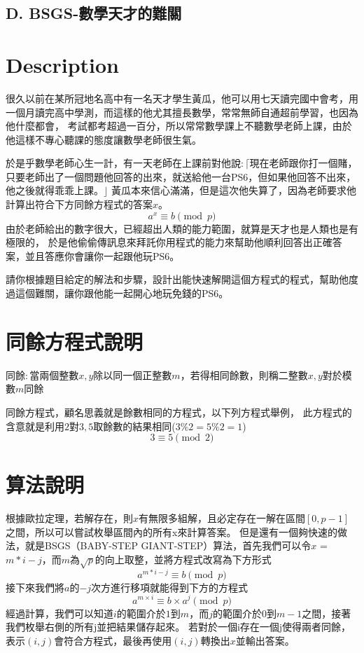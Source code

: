 \documentclass[11pt,a4paper]{article}
\begin{document}
\begin{center}
\section*{D. BSGS-數學天才的難關}
\end{center}

\section*{Description}

很久以前在某所冠地名高中有一名天才學生黃瓜，他可以用七天讀完國中會考，用一個月讀完高中學測，而這樣的他尤其擅長數學，常常無師自通超前學習，也因為他什麼都會，
考試都考超過一百分，所以常常數學課上不聽數學老師上課，由於他這樣不專心聽課的態度讓數學老師很生氣。 

於是乎數學老師心生一計，有一天老師在上課前對他說$ : \lceil $現在老師跟你打一個賭，只要老師出了一個問題他回答的出來，就送給他一台PS6，但如果他回答不出來，他之後就得乖乖上課。$ \rfloor $ 黃瓜本來信心滿滿，但是這次他失算了，因為老師要求他計算出符合下方同餘方程式的答案$x$。
$$
	a^x \equiv b \pmod{p}
$$	
由於老師給出的數字很大，已經超出人類的能力範圍，就算是天才也是人類也是有極限的，
於是他偷偷傳訊息來拜託你用程式的能力來幫助他順利回答出正確答案，並且答應你會讓你一起跟他玩PS6。

請你根據題目給定的解法和步驟，設計出能快速解開這個方程式的程式，幫助他度過這個難關，讓你跟他能一起開心地玩免錢的PS6。

\section*{同餘方程式說明}

同餘$:$當兩個整數$x, y$除以同一個正整數$m$，若得相同餘數，則稱二整數$x, y$對於模數$m$同餘

同餘方程式，顧名思義就是餘數相同的方程式，以下列方程式舉例，
此方程式的含意就是利用$2$對$3, 5$取餘數的結果相同($3\%2 = 5 \% 2 = 1$)\\
$$
	  3 \equiv 5 \pmod{2}
$$

\newpage

\section*{算法說明}
根據歐拉定理，若解存在，則$x$有無限多組解，且必定存在一解在區間$[0, p-1]$之間，所以可以嘗試枚舉區間內的所有x來計算答案。
但是還有一個夠快速的做法，就是BSGS（BABY-STEP GIANT-STEP）算法，首先我們可以令$x$ = $m*i-j$，而$m$為$\sqrt{p}$的向上取整，並將方程式改寫為下方形式  
$$
	a^{m * i - j} \equiv b \pmod{p}
$$
接下來我們將$a$的$-j$次方進行移項就能得到下方的方程式 
$$
	a^{m \times i} \equiv b \times a^{j} \pmod{p}
$$	
經過計算，我們可以知道$i$的範圍介於$1$到$m$，而$j$的範圍介於$0$到$m-1$之間，接著我們枚舉右側的所有j並把結果儲存起來。
若對於一個i存在一個j使得兩者同餘，表示$(i, j)$會符合方程式，最後再使用$(i, j)$轉換出$x$並輸出答案。
\end{document}
